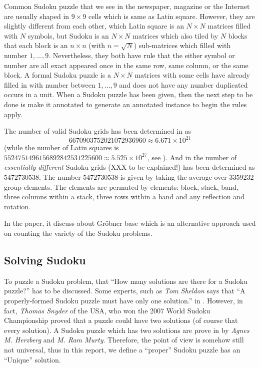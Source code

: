 \documentclass[11pt]{report}
\begin{document}
Common Sudoku puzzle that we see in the newspaper, magazine or the Internet are usually shaped in $9 \times 9$ cells which is same as Latin square. However, they are slightly different from each other, which Latin square is an $N \times N$ matrices filled with $N$ symbols, but Sudoku is an  $N \times N$ matrices which also tiled by $N$ blocks that each block is an $n \times n$ (with $n = \sqrt{N}$) sub-matrices which filled with number $1,\dots ,9$. Nevertheless, they both have rule that the either symbol or number are all exact appeared once in the same row, same column, or the same block. A formal Sudoku puzzle is a $N \times N$ matrices with some cells have already filled in with number between $1,\dots ,9$ and does not have any number duplicated occurs in a unit. When a Sudoku puzzle has been given, then the next step to be done is make it annotated to generate an annotated instance to begin the rules apply.

The number of valid Sudoku grids has been determined in \cite{FelgenhauerJarvis2006SudokuI} as
\begin{displaymath}
  6670903752021072936960 \approx 6.671 \times 10^{21}
\end{displaymath}
(while the number of Latin squares is $5524751496156892842531225600 \approx 5.525 \times 10^{27}$, see  \cite{FelgenhauerJarvis2006SudokuI}). And in \cite{FelgenhauerJarvis2006SudokuII} the number of \emph{essentially different} Sudoku grids (XXX to be explained!) has been determined as $5472730538$. The number $5472730538$ is given by taking the average over $3359232$ group elements. The elements are permuted by elements: block, stack, band, three columns within a stack, three rows within a band and any reflection and rotation.

In the paper\cite{ArnoldLucasTaalman2009BasisRepresentations}, it discuss about Gr\"{o}bner base which is an alternative approach used on counting the variety of the Sudoku problems.




\subsection{Solving Sudoku}
\label{sec:solvingsudoku}

To puzzle a Sudoku problem, that ``How many solutions are there for a Sudoku puzzle?'' has to be discussed. Some experts, such as \emph{Tom Sheldon} says that ``A properly-formed Sudoku puzzle must have only one solution.'' in \cite{Sheldon2006Sudoku}. However, in fact, \emph{Thomas Snyder} of the USA, who won the 2007 World Sudoku Championship proved that a puzzle could have two solutions (of course that every solution). A Sudoku puzzle which has two solutions are prove in \cite{Murty2007Sudoku} by \emph{Agnes M. Herzberg} and \emph{M. Ram Murty}. Therefore, the point of view is somehow still not universal, thus in this report, we define a ``proper'' Sudoku puzzle has an ``Unique'' solution.
\end{document}
